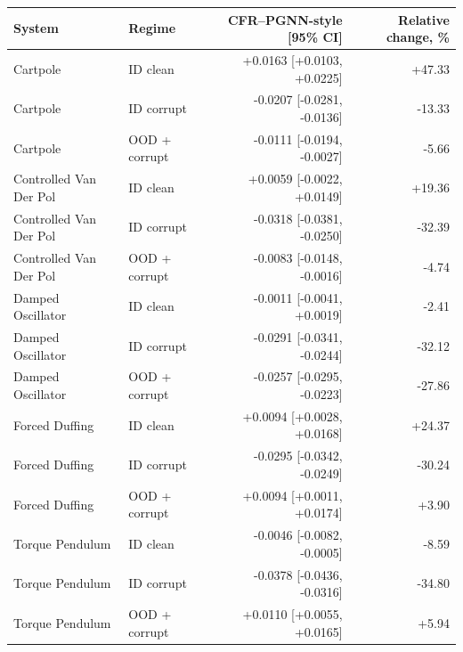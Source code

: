 \begin{tabular}{llrr}
\toprule
System & Regime & CFR--PGNN-style [95\% CI] & Relative change, \% \\
\midrule
Cartpole & ID clean & +0.0163 [+0.0103, +0.0225] & +47.33 \\
Cartpole & ID corrupt & -0.0207 [-0.0281, -0.0136] & -13.33 \\
Cartpole & OOD + corrupt & -0.0111 [-0.0194, -0.0027] & -5.66 \\
Controlled Van Der Pol & ID clean & +0.0059 [-0.0022, +0.0149] & +19.36 \\
Controlled Van Der Pol & ID corrupt & -0.0318 [-0.0381, -0.0250] & -32.39 \\
Controlled Van Der Pol & OOD + corrupt & -0.0083 [-0.0148, -0.0016] & -4.74 \\
Damped Oscillator & ID clean & -0.0011 [-0.0041, +0.0019] & -2.41 \\
Damped Oscillator & ID corrupt & -0.0291 [-0.0341, -0.0244] & -32.12 \\
Damped Oscillator & OOD + corrupt & -0.0257 [-0.0295, -0.0223] & -27.86 \\
Forced Duffing & ID clean & +0.0094 [+0.0028, +0.0168] & +24.37 \\
Forced Duffing & ID corrupt & -0.0295 [-0.0342, -0.0249] & -30.24 \\
Forced Duffing & OOD + corrupt & +0.0094 [+0.0011, +0.0174] & +3.90 \\
Torque Pendulum & ID clean & -0.0046 [-0.0082, -0.0005] & -8.59 \\
Torque Pendulum & ID corrupt & -0.0378 [-0.0436, -0.0316] & -34.80 \\
Torque Pendulum & OOD + corrupt & +0.0110 [+0.0055, +0.0165] & +5.94 \\
\bottomrule
\end{tabular}
